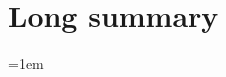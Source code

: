 \documentclass[11pt,a4paper]{article}
\begin{document}
%
\flyleaf

\clearpage



\clearpage

\section{Long summary}

\clearpage

\appendix

\emergencystretch=1em

\label{sec:references}
\printbibliography[heading=bibintoc,title={References}]
\end{document}

